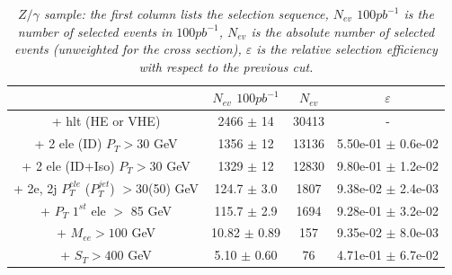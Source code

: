 


\begin{table}[htbp]
\begin{center}
\begin{tabular}{|c|c|c|c|}
\hline
\hline
 & $N_{ev}$ $100pb^{-1}$ & $N_{ev}$ & $\varepsilon$ \\
\hline
\hline

+ hlt (HE or VHE) &2466 $\pm$ 14& 30413 & - \\
+ 2 ele (ID) $P_{T} >30$ GeV &1356 $\pm$ 12& 13136 & 5.50e-01 $\pm$ 0.6e-02\\
+ 2 ele (ID+Iso) $P_{T} >30$ GeV &1329 $\pm$ 12& 12830 & 9.80e-01 $\pm$ 1.2e-02\\
+ 2e, 2j $P_{T}^{ele}$ ($P_{T}^{jet}$) $>$30(50) GeV &124.7 $\pm$ 3.0 & 1807 & 9.38e-02 $\pm$ 2.4e-03\\
+ $P_{T}$ $1^{st}$ ele $>$ 85 GeV &115.7 $\pm$ 2.9& 1694 & 9.28e-01 $\pm$ 3.2e-02\\
+ $M_{ee} >100$ GeV&10.82 $\pm$ 0.89& 157 & 9.35e-02 $\pm$ 8.0e-03\\
+ $S_{T} >400$ GeV &5.10 $\pm$ 0.60& 76 & 4.71e-01 $\pm$ 6.7e-02\\
\hline
\end{tabular}
\end{center}
\caption{\small \sl $Z/\gamma$ sample: the first column lists the selection sequence, $N_{ev}$ $100pb^{-1}$ is the number of selected events in $100pb^{-1}$, $N_{ev}$ is the absolute number of selected events (unweighted for the cross section), $\varepsilon$ is the relative selection efficiency with respect to the previous cut.}
\label{tab:selection_effic_zjet}
\end{table}

